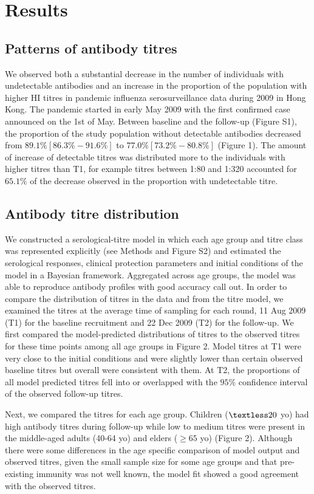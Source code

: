 \documentclass{article}
\begin{document}
\section{Results}
\subsection{Patterns of antibody titres}
We observed both a substantial decrease in the number of individuals with undetectable antibodies and an increase in the proportion of the population with higher HI titres in pandemic influenza serosurveillance data during 2009 in Hong Kong. The pandemic started in early May 2009 with the first confirmed case announced on the 1st of May. Between baseline and the follow-up (Figure S1), the proportion of the study population without detectable antibodies decreased from $89.1\% [86.3\%-91.6\% ]$ to $77.0\% [73.2\%-80.8\%]$ (Figure 1). The amount of increase of detectable titres was distributed more to the individuals with higher titres than T1, for example titres between 1:80 and 1:320 accounted for $65.1\%$ of the decrease observed in the proportion with undetectable titre.

\subsection{Antibody titre distribution}
We constructed a serological-titre model in which each age group and titre class was represented explicitly (see Methods and Figure S2) and estimated the serological responses, clinical protection parameters and initial conditions of the model in a Bayesian framework. Aggregated across age groups, the model was able to reproduce antibody profiles with good accuracy call out. In order to compare the distribution of titres in the data and from the titre model, we examined the titres at the average time of sampling for each round, 11 Aug 2009 (T1) for the baseline recruitment and 22 Dec 2009 (T2) for the follow-up. We first compared the model-predicted distributions of titres to the observed titres for these time points among all age groups in Figure 2. Model titres at T1 were very close to the initial conditions and were slightly lower than certain observed baseline titres but overall were consistent with them. At T2, the proportions of all model predicted titres fell into or overlapped with the $95\%$ confidence interval of the observed follow-up titres. 

Next, we compared the titres for each age group. Children ($\textless20$ yo) had high antibody titres during follow-up while low to medium titres were present in the middle-aged adults (40-64 yo) and elders ($\geq65$ yo) (Figure 2). Although there were some differences in the age specific comparison of model output and observed titres, given the small sample size for some age groups and that pre-existing immunity was not well known, the model fit showed a good agreement with the observed titres. 
\end{document}
